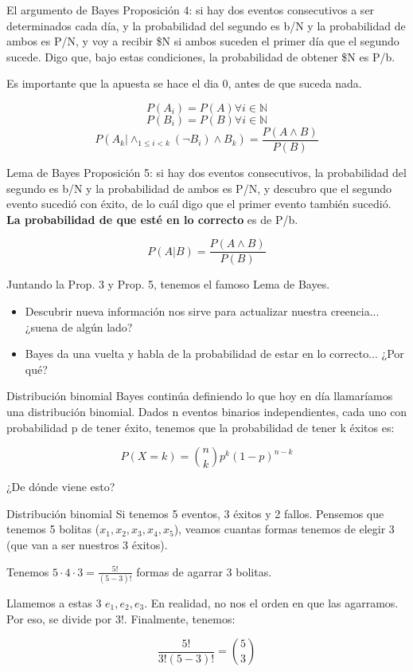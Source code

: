 \documentclass{beamer}
\begin{document}
\begin{frame}{El argumento de Bayes}
	Proposición 4: si hay dos eventos consecutivos a ser determinados cada día, y la probabilidad del segundo es b/N y la probabilidad de ambos es P/N, y voy a recibir \$N si ambos suceden el primer día que el segundo sucede. Digo que, bajo estas condiciones, la probabilidad de obtener \$N es P/b.

    Es importante que la apuesta se hace el dia 0, antes de que suceda nada.\pause

    $$P(A_i) = P(A) \forall i \in \mathbb{N}$$
    $$P(B_i) = P(B) \forall i \in \mathbb{N}$$
	$$P(A_k | \land_{1 \leq i < k} (\neg B_i) \land  B_k) = \frac{P(A \land B)}{P(B)}$$
\end{frame}

\begin{frame}{Lema de Bayes}
	Proposición 5: si hay dos eventos consecutivos, la probabilidad del segundo es b/N y la probabilidad de ambos es P/N, y descubro que el segundo evento sucedió con éxito, de lo cuál digo que el primer evento también sucedió. \textbf{La probabilidad de que esté en lo correcto} es de P/b.\pause

	$$P(A | B) = \frac{P(A \land B)}{P(B)}$$

	Juntando la Prop. 3 y Prop. 5, tenemos el famoso Lema de Bayes.
	\pause

	\begin{itemize}
		\item Descubrir nueva información nos sirve para actualizar nuestra creencia... ¿suena de algún lado?\pause
		\item Bayes da una vuelta y habla de la probabilidad de estar en lo correcto... ¿Por qué?
	\end{itemize}
\end{frame}


\begin{frame}{Distribución binomial}
	Bayes continúa definiendo lo que hoy en día llamaríamos una distribución binomial. Dados n eventos binarios independientes, cada uno con probabilidad p de tener éxito, tenemos que la probabilidad de tener k éxitos es:
	
	$$P(X=k) = \binom{n}{k} p^k (1-p)^{n-k}$$
	
	¿De dónde viene esto?
\end{frame}

\begin{frame}{Distribución binomial}
	Si tenemos 5 eventos, 3 éxitos y 2 fallos. Pensemos que tenemos 5 bolitas ($x_1, x_2, x_3, x_4, x_5$), veamos cuantas formas tenemos de elegir 3 (que van a ser nuestros 3 éxitos).\pause
	
	Tenemos $5 \cdot 4 \cdot 3 = \frac{5!}{(5-3)!}$ formas de agarrar 3 bolitas.\pause

	Llamemos a estas 3 $e_1, e_2, e_3$. En realidad, no nos el orden en que las agarramos. Por eso, se divide por $3!$. Finalmente, tenemos:

	$$\frac{5!}{3!(5-3)!} = \binom{5}{3}$$
\end{frame}
\end{document}
